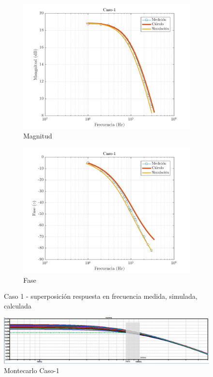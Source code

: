 \documentclass[../../main.tex]{subfiles}
\begin{document}
\begin{figure}[H]
\centering
\begin{subfigure}[http]{0.49\textwidth}
\includegraphics[width=\textwidth]{imagenes/Caso-1_mag_n.png}
\caption{Magnitud}\label{fig=magnC1}
\end{subfigure}
\begin{subfigure}[http]{0.49\textwidth}
\includegraphics[width=\textwidth]{imagenes/Caso-1_fase_n.png}
\caption{Fase}
\end{subfigure}
\caption{Caso 1 - superposición respuesta en  frecuencia medida, simulada, calculada}
\end{figure}

\begin{figure}[H]
\centering
\includegraphics[width=1\textwidth]{imagenes/montecarlo_n_c1.png}
\caption{Montecarlo Caso-1} \label{fig=mcnC1}
\end{figure}
\end{document}
